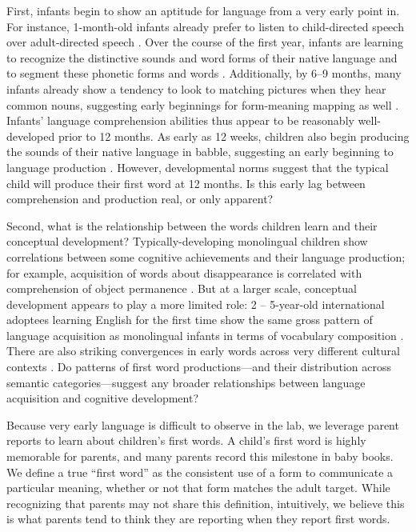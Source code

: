\documentclass[10pt,letterpaper]{article}
\begin{document}
First, infants begin to show an aptitude for language from a very early point in. For instance, 1-month-old infants already prefer to listen to child-directed speech over adult-directed speech \cite{cooper1990}. Over the course of the first year, infants are learning to recognize the distinctive sounds and word forms of their native language and to segment these phonetic forms and words \cite{kuhl2004,werker2005}. Additionally, by 6--9 months, many infants already show a tendency to look to matching pictures when they hear common nouns, suggesting early beginnings for form-meaning mapping as well \cite{tincoff2012,bergelson2012}. Infants' language comprehension abilities thus appear to be reasonably well-developed prior to 12 months. As early as 12 weeks, children also begin producing the sounds of their native language in babble, suggesting an early beginning to language production \cite{kuhl2004}. However, developmental norms suggest that the typical child will produce their first word at 12 months. Is this early lag between comprehension and production real, or only apparent?

Second, what is the relationship between the words children learn and their conceptual development? Typically-developing monolingual children show correlations between some cognitive achievements and their language production; for example, acquisition of words about disappearance is correlated with comprehension of object permanence \cite{gopnik1986}. But at a larger scale, conceptual development appears to play a more limited role: 2 -- 5-year-old international adoptees learning English for the first time show the same gross pattern of language acquisition as monolingual infants in terms of vocabulary composition \cite{snedeker2007}. There are also striking convergences in early words across very different cultural contexts \cite{tardif2007}. Do patterns of first word productions---and their distribution across semantic categories---suggest any broader relationships between language acquisition and cognitive development? 

Because very early language is difficult to observe in the lab, we leverage parent reports to learn about children's first words. A child's first word is highly memorable for parents, and many parents record this milestone in baby books. We define a true ``first word'' as the consistent use of a form to communicate a particular meaning, whether or not that form matches the adult target. While recognizing that parents may not share this definition, intuitively, we believe this is what parents tend to think they are reporting when they report first words. 
\end{document}
